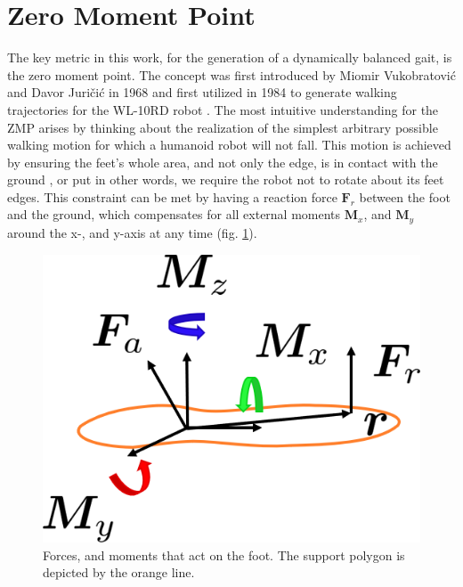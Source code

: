 
\FloatBarrier
\section{Zero Moment Point}
\label{sec::21_zmp}
The key metric in this work, for the generation of a dynamically balanced gait, is the zero moment point. The concept was first introduced by Miomir Vukobratovi\'{c} and Davor Juri\v{c}i\'{c} in 1968 \cite{vukobratovic1968contribution}\cite{vukobratovic1969contribution} and first utilized in 1984 to generate walking trajectories for the WL-10RD robot \cite{yamaguchi1993development}. The most intuitive understanding for the ZMP arises by thinking about the realization of the simplest arbitrary possible walking motion for which a humanoid robot will not fall. This motion is achieved by ensuring the feet's whole area, and not only the edge, is in contact with the ground \cite{vukobratovic2004zero}, or put in other words, we require the robot not to rotate about its feet edges. This constraint can be met by having a reaction force $\bm{F}_r$ between the foot and the ground, which compensates for all external moments $\bm{M}_x$, and $\bm{M}_y$ around the x-, and y-axis at any time (fig. \ref{fig::21_zmp}).
\begin{figure}[h!]
	\centering
	\includegraphics[scale=.5]{chapters/02_foundations_for_humanoid_walking/img/zero_moment_point.png}
	\caption{Forces, and moments that act on the foot. The support polygon is depicted by the orange line.}
	\label{fig::21_zmp}
\end{figure}
